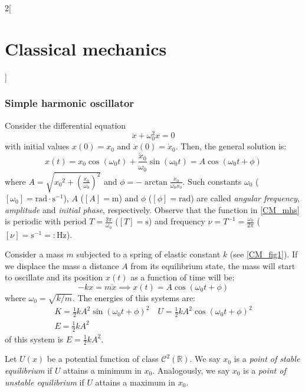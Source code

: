 \documentclass[../../../main.tex]{subfiles}
\begin{document}
\begin{multicols}{2}[\section{Classical mechanics}]
  \subsubsection{Simple harmonic oscillator}
  \begin{prop}
    Consider the differential equation $$\ddot{x}+\omega_0^2 x=0$$ with initial values $x(0)=x_0$ and $\dot{x}(0)=\dot{x}_0$. Then, the general solution is:
    \begin{equation}
      x(t)=x_0\cos(\omega_0t)+\frac{\dot{x}_0}{\omega_0}\sin(\omega_0t)=A\cos(\omega_0t+\phi)
      \label{CM_mhs}
    \end{equation} where $\displaystyle A=\sqrt{{x_0}^2+{\left(\frac{\dot{x}_0}{\omega_0}\right)}^2}$ and $\displaystyle \phi=-\arctan\frac{\dot{x}_0}{\omega_0x_0}$. Such constants $\omega_0$ ($[\omega_0]=\text{rad}\cdot \text{s}^{-1}$), $A$ ($[A]=\text{m}$) and $\phi$ ($[\phi]=\text{rad}$) are called \textit{angular frequency}, \textit{amplitude} and \textit{initial phase}, respectively. Observe that the function in \cref{CM_mhs} is periodic with period $T=\frac{2\pi}{\omega_0}$ ($[T]=\text{s}$) and frequency $\nu=T^{-1}=\frac{\omega_0}{2\pi}$ ($[\nu]=\text{s}^{-1}=:\text{Hz}$).
  \end{prop}
  \begin{prop}
    Consider a mass $m$ subjected to a spring of elastic constant $k$ (see \cref{CM_fig1}). If we displace the mass a distance $A$ from its equilibrium state, the mass will start to oscillate and its position $x(t)$ as a function of time will be:
    $$-kx=m\ddot{x}\implies x(t)=A\cos(\omega_0t+\phi)$$ where $\omega_0=\sqrt{k/m}$. The energies of this systems are:
    \begin{gather*}
      K=\frac{1}{2}kA^2\sin(\omega_0 t+\phi)^2\quad U=\frac{1}{2}kA^2\cos(\omega_0 t+\phi)^2\\
      E=\frac{1}{2}kA^2
    \end{gather*}
    of this system is $E=\frac{1}{2}kA^2$.
    \begin{center}
      \begin{minipage}{\linewidth}
        \centering
        
        \label{CM_fig1}
      \end{minipage}
    \end{center}
  \end{prop}
  \begin{definition}
    Let $U(x)$ be a potential function of class $\mathcal{C}^2(\mathbb{R})$. We say $x_0$ is a \textit{point of stable equilibrium} if $U$ attains a minimum in $x_0$. Analogously, we say $x_0$ is a \textit{point of unstable equilibrium} if $U$ attains a maximum in $x_0$.

\end{definition}
\end{multicols}
\end{document}

